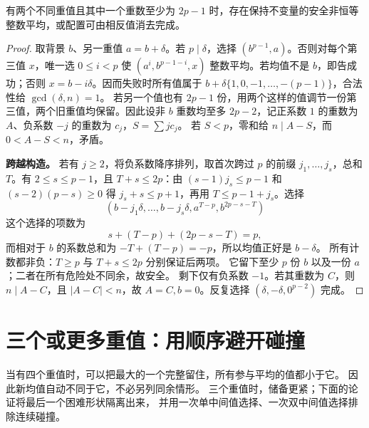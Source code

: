 \begin{lemma}[有充足背景副本时的续步]\label{lem:background}
有两个不同重值且其中一个重数至少为 $2p-1$ 时，存在保持不变量的安全非恒等整数平均，或配置可由相反值消去完成。
\end{lemma}
\begin{proof}
取背景 $b$、另一重值 $a=b+\delta$。若 $p\mid\delta$，选择 $(b^{p-1},a)$。否则对每个第三值 $x$，唯一选 $0\le i<p$ 使 $(a^i,b^{p-1-i},x)$ 整数平均。若均值不是 $b$，即告成功；否则 $x=b-i\delta$。因而失败时所有值属于 $b+\delta\{1,0,-1,\ldots,-(p-1)\}$，合法性给 $\gcd(\delta,n)=1$。
若另一个值也有 $2p-1$ 份，用两个这样的值调节一份第三值，两个旧重值均保留。因此设非 $b$ 重数均至多 $2p-2$，记正系数 $1$ 的重数为 $A$、负系数 $-j$ 的重数为 $c_j$，$S=\sum j c_j$。
若 $S<p$，零和给 $n\mid A-S$，而 $0<A-S<n$，矛盾。\par\noindent\textbf{跨越构造。}
若有 $j\ge2$，将负系数降序排列，取首次跨过 $p$ 的前缀 $j_1,\ldots,j_s$，总和 $T$。有 $2\le s\le p-1$，且 $T+s\le2p$：由 $(s-1)j_s\le p-1$ 和 $(s-2)(p-s)\ge0$ 得 $j_s+s\le p+1$，再用 $T\le p-1+j_s$。选择
\[(b-j_1\delta,\ldots,b-j_s\delta,a^{T-p},b^{2p-s-T})
\]
这个选择的项数为
\[
s+(T-p)+(2p-s-T)=p,
\]
而相对于 $b$ 的系数总和为 $-T+(T-p)=-p$，所以均值正好是 $b-\delta$。
所有计数都非负：$T\ge p$ 与 $T+s\le2p$ 分别保证后两项。
它留下至少 $p$ 份 $b$ 以及一份 $a$；二者在所有危险处不同余，故安全。
剩下仅有负系数 $-1$。若其重数为 $C$，则 $n\mid A-C$，且 $|A-C|<n$，故 $A=C,b=0$。反复选择 $(\delta,-\delta,0^{p-2})$ 完成。
\end{proof}


\section{三个或更多重值：用顺序避开碰撞}
当有四个重值时，可以把最大的一个完整留住，所有参与平均的值都小于它。
因此新均值自动不同于它，不必另列同余情形。
三个重值时，储备更紧；下面的论证将最后一个困难形状隔离出来，
并用一次单中间值选择、一次双中间值选择排除连续碰撞。

